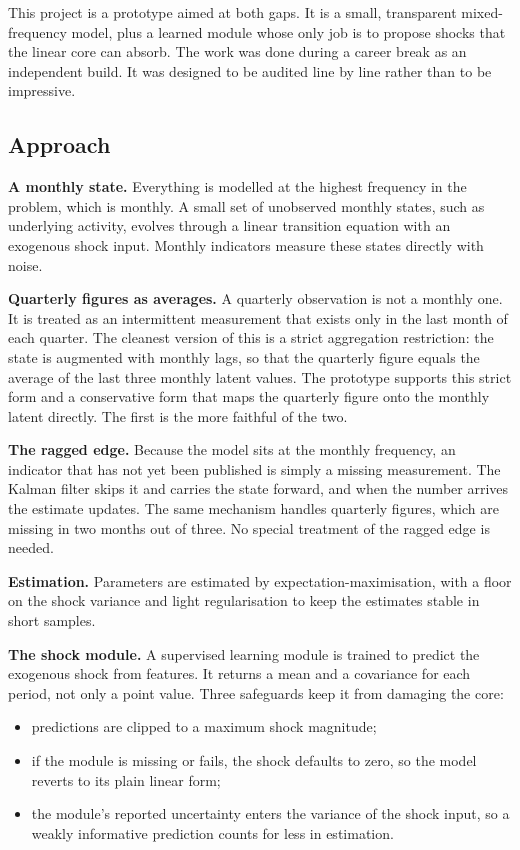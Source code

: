 \documentclass[
  british,
  a4paper,
]{article}
\providecommand{\tightlist}{%
  \setlength{\itemsep}{0pt}\setlength{\parskip}{0pt}}
\begin{document}
This project is a prototype aimed at both gaps. It is a small,
transparent mixed-frequency model, plus a learned module whose only job
is to propose shocks that the linear core can absorb. The work was done
during a career break as an independent build. It was designed to be
audited line by line rather than to be impressive.

\subsection{Approach}\label{approach}

\textbf{A monthly state.} Everything is modelled at the highest
frequency in the problem, which is monthly. A small set of unobserved
monthly states, such as underlying activity, evolves through a linear
transition equation with an exogenous shock input. Monthly indicators
measure these states directly with noise.

\textbf{Quarterly figures as averages.} A quarterly observation is not a
monthly one. It is treated as an intermittent measurement that exists
only in the last month of each quarter. The cleanest version of this is
a strict aggregation restriction: the state is augmented with monthly
lags, so that the quarterly figure equals the average of the last three
monthly latent values. The prototype supports this strict form and a
conservative form that maps the quarterly figure onto the monthly latent
directly. The first is the more faithful of the two.

\textbf{The ragged edge.} Because the model sits at the monthly
frequency, an indicator that has not yet been published is simply a
missing measurement. The Kalman filter skips it and carries the state
forward, and when the number arrives the estimate updates. The same
mechanism handles quarterly figures, which are missing in two months out
of three. No special treatment of the ragged edge is needed.

\textbf{Estimation.} Parameters are estimated by
expectation-maximisation, with a floor on the shock variance and light
regularisation to keep the estimates stable in short samples.

\textbf{The shock module.} A supervised learning module is trained to
predict the exogenous shock from features. It returns a mean and a
covariance for each period, not only a point value. Three safeguards
keep it from damaging the core:

\begin{itemize}
\tightlist
\item
  predictions are clipped to a maximum shock magnitude;
\item
  if the module is missing or fails, the shock defaults to zero, so the
  model reverts to its plain linear form;
\item
  the module's reported uncertainty enters the variance of the shock
  input, so a weakly informative prediction counts for less in
  estimation.
\end{itemize}
\end{document}
